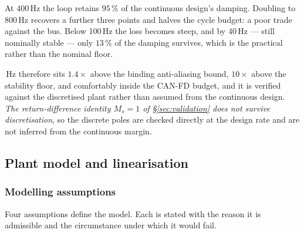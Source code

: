 At 400\,Hz the loop retains $95\,\%$ of the continuous design's damping.
Doubling to 800\,Hz recovers a further three points and halves the cycle
budget: a poor trade against the bus. Below 100\,Hz the loss becomes steep,
and by 40\,Hz --- still nominally stable --- only $13\,\%$ of the damping
survives, which is the practical rather than the nominal floor.

\medskip
{}\,Hz therefore sits $1.4\times$ above the binding anti-aliasing bound,
$10\times$ above the stability floor, and comfortably inside the CAN-FD
budget, and it is verified against the discretised plant rather than assumed
from the continuous design. \emph{The return-difference identity
$M_s = 1$ of \S\ref{sec:validation} does not survive discretisation}, so the
discrete poles are checked directly at the design rate and are not inferred
from the continuous margin.

\subsection{Plant model and linearisation}
\label{sec:plant}

\subsubsection{Modelling assumptions}
\label{sec:assumptions}

Four assumptions define the model. Each is stated with the reason it is
admissible and the circumstance under which it would fail.


